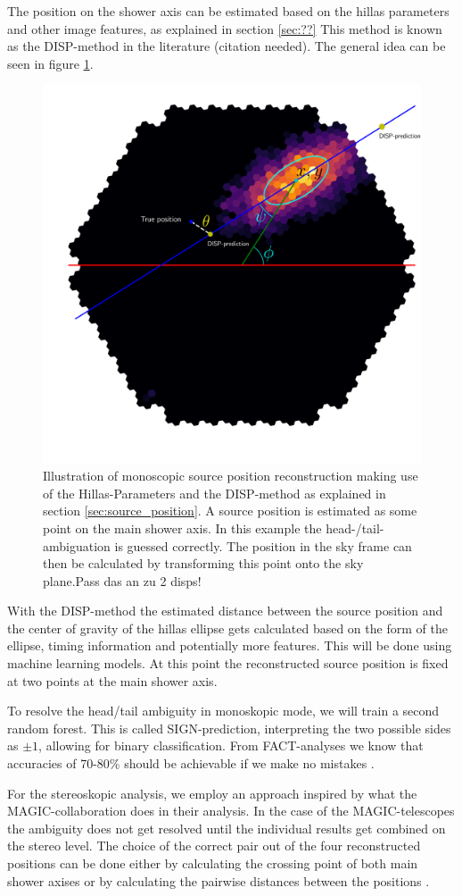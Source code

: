 The position on the shower axis can be estimated based on 
the hillas parameters and other image features, as 
explained in section \ref{sec:??}
This method is known as the DISP-method in the
literature (citation needed). The general idea 
can be seen in figure \ref{fig:disp}.

\begin{figure}
    \centering
    \includegraphics[width=0.6\linewidth]{Plots/hillas_complete.pdf}
    \caption{Illustration of monoscopic source position reconstruction making use of 
        the Hillas-Parameters and the DISP-method as explained in section \ref{sec:source_position}.
        A source position is estimated as some point on the main shower axis.
        In this example the head-/tail-ambiguation is guessed correctly.
        The position in the sky frame can then be calculated by transforming this
        point onto the sky plane.Pass das an zu 2 disps!}
    \label{fig:disp}
\end{figure}

With the DISP-method the estimated distance between the source
position and the center of gravity of the hillas ellipse gets calculated
based on the form of the ellipse, timing information and potentially
more features.
This will be done using machine learning models.
At this point the reconstructed source position
is fixed at two points at the main shower axis.

To resolve the head/tail ambiguity in monoskopic mode,
we will train a second random forest.
This is called SIGN-prediction, interpreting the two possible sides
as $\pm1$, allowing for binary classification.
From FACT-analyses we know that accuracies of 70-80\% should be achievable
if we make no mistakes \cite{some fact paper}.

For the stereoskopic analysis, we employ an approach inspired by 
what the MAGIC-collaboration does in their analysis.
In the case of the MAGIC-telescopes the ambiguity does not
get resolved until the individual results get combined
on the stereo level. The choice of the correct
pair out of the four reconstructed positions can be done either
by calculating the crossing point of both main shower axises
or by calculating the pairwise distances between the positions \cite{magic disp paper}.


